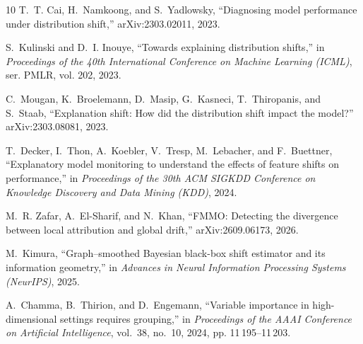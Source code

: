 \documentclass[conference]{IEEEtran}
\theoremstyle{plainhead}
\begin{document}
\begin{thebibliography}{10}
T.~T. Cai, H.~Namkoong, and S.~Yadlowsky, ``Diagnosing model performance under
  distribution shift,'' arXiv:2303.02011, 2023.

S.~Kulinski and D.~I. Inouye, ``Towards explaining distribution shifts,'' in
  \emph{Proceedings of the 40th International Conference on Machine Learning
  (ICML)}, ser. PMLR, vol. 202, 2023.

C.~Mougan, K.~Broelemann, D.~Masip, G.~Kasneci, T.~Thiropanis, and S.~Staab,
  ``Explanation shift: How did the distribution shift impact the model?''
  arXiv:2303.08081, 2023.

T.~Decker, I.~Thon, A.~Koebler, V.~Tresp, M.~Lebacher, and F.~Buettner,
  ``Explanatory model monitoring to understand the effects of feature shifts on
  performance,'' in \emph{Proceedings of the 30th ACM SIGKDD Conference on
  Knowledge Discovery and Data Mining (KDD)}, 2024.

M.~R. Zafar, A.~El-Sharif, and N.~Khan, ``{FMMO}: Detecting the divergence
  between local attribution and global drift,'' arXiv:2609.06173, 2026.

M.~Kimura, ``Graph--smoothed {B}ayesian black-box shift estimator and its
  information geometry,'' in \emph{Advances in Neural Information Processing
  Systems (NeurIPS)}, 2025.

A.~Chamma, B.~Thirion, and D.~Engemann, ``Variable importance in
  high-dimensional settings requires grouping,'' in \emph{Proceedings of the
  AAAI Conference on Artificial Intelligence}, vol.~38, no.~10, 2024, pp.
  11\,195--11\,203.

\end{thebibliography}
\end{document}
